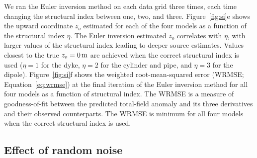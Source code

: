 We ran the Euler inversion method on each data grid three times, each time changing the structural index between one, two, and three.
Figure~\ref{fig:si}e shows the upward coordinate $z_o$ estimated for each of the four models as a function of the structural index $\eta$.
The Euler inversion estimated $z_o$ correlates with $\eta$, with larger values of the structural index leading to deeper source estimates.
Values closest to the true $z_o=\SynSITrueUp$ are achieved when the correct structural index is used ($\eta=1$ for the dyke, $\eta=2$ for the cylinder and pipe, and $\eta=3$ for the dipole).
Figure~\ref{fig:si}f shows the weighted root-mean-squared error (WRMSE; Equation~\ref{eq:wrmse}) at the final iteration of the Euler inversion method for all four models as a function of structural index.
The WRMSE is a measure of goodness-of-fit between the predicted total-field anomaly and its three derivatives and their observed counterparts.
The WRMSE is minimum for all four models when the correct structural index is used.


\subsection{Effect of random noise}
\label{sec:noise}

